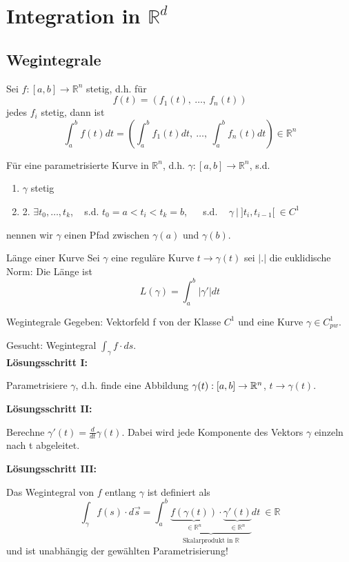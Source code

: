 \section{Integration in $\mathbb{R}^d$}

\subsection{Wegintegrale}

Sei $f: [a, b] \rightarrow \mathbb{R}^{n}$ stetig, d.h. für
\[ f(t) = (f_1(t), ~ \ldots, ~ f_n(t)) \]
jedes $f_i$ stetig, dann ist
\[ \int_a^b f(t) dt = \left( \int_a^b f_1(t) dt, ~ \ldots , ~ \int_a^b f_n(t) dt\right) \in \mathbb{R}^n \]

Für eine parametrisierte Kurve in $\mathbb{R}^n$, d.h.
$\gamma : [a, b] \rightarrow \mathbb{R}^n$, s.d.
\begin{enumerate}
\item{ $\gamma$ stetig}
\item{2. $\exists t_0, \ldots, t_k$, ~ s.d. $t_0 = a < t_i < t_k = b$, ~~ s.d. ~
$\gamma ~ | ~ ]t_i, t_{i-1}[ ~ \in C^1$}
\end{enumerate}
nennen wir $\gamma$ einen Pfad zwischen
$\gamma(a)$ und $\gamma(b)$. 

\begin{Satz}{Länge einer Kurve}{}
	Sei $\gamma$ eine reguläre Kurve $t \to \gamma(t)$ sei $|.|$ die euklidische Norm: Die Länge ist
	\[
  		L(\gamma) = \int_a^b |\gamma'| dt
  	\]
\end{Satz}

\begin{Rezept}{Wegintegrale}{}
	Gegeben: Vektorfeld f von der Klasse $C^1$ und eine Kurve $\gamma \in C^1_{pw}$.
	
	Gesucht: Wegintegral $\int_\gamma f \cdot ds$.\\
	
	\textbf{Lösungsschritt I:}
	
	Parametrisiere $\gamma$, d.h. finde eine Abbildung $\gamma(t) : [a, b] \to \mathbb{R}^n$, $t \to \gamma(t)$.
	
	\textbf{Lösungsschritt II:}
	
	Berechne $\gamma'(t) = \frac{d}{dt} \gamma(t)$. Dabei wird jede Komponente des Vektors $\gamma$ einzeln nach t abgeleitet.
	
	\textbf{Lösungsschritt III:}
	
	Das Wegintegral von $f$ entlang $\gamma$ ist definiert als
	\[
		\int_{\gamma} f(s)\cdot d\vec{s} = 
		\int_a^b \underbrace{\underbrace{f(\gamma(t))}_{\in\mathbb{R}^n}  \cdot 
		\underbrace{\gamma'(t)}_{\in\mathbb{R}^n}}_{\text{Skalarprodukt in } \mathbb{R}} dt  ~
		\in \mathbb{R}
	\]
	und ist unabhängig der gewählten Parametrisierung!
\end{Rezept}

